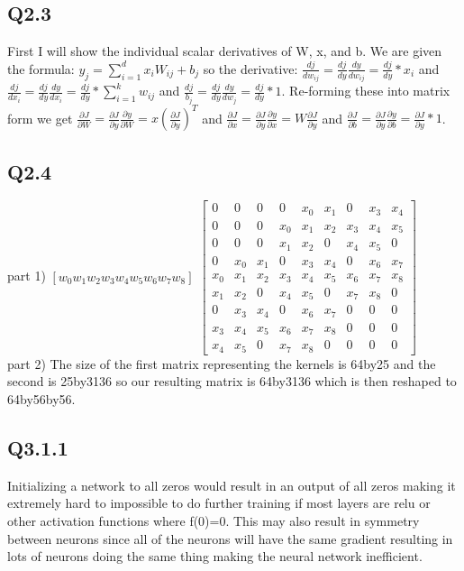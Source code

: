 \documentclass{article}
\begin{document}
\subsection*{Q2.3}
\begin{flushleft}
    First I will show the individual scalar derivatives of W, x, and b. We are given the formula: 
    $y_j=\sum_{i=1}^{d}x_iW_{ij}+b_j$ so the derivative: $\frac{dj}{dw_{ij}}=
    \frac{dj}{dy}\frac{dy}{dw_{ij}}=\frac{dj}{dy}*x_i$ and $\frac{dj}{dx_{i}}=
    \frac{dj}{dy}\frac{dy}{dx_{i}}=\frac{dj}{dy}*\sum_{i=1}^{k}w_{ij}$ and 
    $\frac{dj}{b_j}=\frac{dj}{dy}\frac{dy}{dw_j}=\frac{dj}{dy}*1$. Re-forming these into 
    matrix form we get $\frac{\partial J}{\partial W}=
    \frac{\partial J}{\partial y}\frac{\partial y}{\partial W}=
    x (\frac{\partial J}{\partial y})^T$ and 
    $\frac{\partial J}{\partial x}=
    \frac{\partial J}{\partial y}\frac{\partial y}{\partial x}=
    W \frac{\partial J}{\partial y}$ and
    $\frac{\partial J}{\partial b}=
    \frac{\partial J}{\partial y}\frac{\partial y}{\partial b}=
    \frac{\partial J}{\partial y}*1$.
\end{flushleft}
\subsection*{Q2.4}
    
\begin{flushleft}
    part 1) 
    $[w_0 w_1 w_2 w_3 w_4 w_5 w_6 w_7 w_8]$
    $\begin{bmatrix}
        0 & 0 & 0 & 0 & x_0 & x_1&0&x_3&x_4\\
        0&0&0&x_0&x_1&x_2&x_3&x_4&x_5\\
        0&0&0&x_1&x_2&0&x_4&x_5&0\\
        0&x_0&x_1&0&x_3&x_4&0&x_6&x_7\\
        x_0&x_1&x_2&x_3&x_4&x_5&x_6&x_7&x_8\\
        x_1&x_2&0&x_4&x_5&0&x_7&x_8&0\\
        0&x_3&x_4&0&x_6&x_7&0&0&0\\
        x_3&x_4&x_5&x_6&x_7&x_8&0&0&0\\
        x_4&x_5&0&x_7&x_8&0&0&0&0
    \end{bmatrix}$
    \\
    part 2) The size of the first matrix representing the kernels is 64by25 and the second is 
    25by3136 so our resulting matrix is 64by3136 which is then reshaped to 64by56by56.
\end{flushleft}
\newpage
\subsection*{Q3.1.1}
\begin{flushleft}
    Initializing a network to all zeros would result in an output of all zeros making it extremely hard 
    to impossible to do further training if most layers are relu or other activation functions where f(0)=0.
    This may also result in symmetry between neurons since all of the neurons will have the same gradient 
    resulting in lots of neurons doing the same thing making the neural network inefficient.
\end{flushleft}
\end{document}
